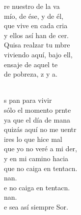 \begin{cancion}%
	re nuestro de la va\\
	mío, de ése, y de él,\\
	que vive en cada cria\\
	y ellos así han de cer.\\
	Quisa realzar tu mbre\\
	viviendo aquí, bajo ell,\\
	ensaje de aquel te\\
	de pobreza, z y a.\\\jump\\
	\begin{chorus}%
	s pan para vivir\\
	sólo el momento prnte\\
	ya que el día de mana \\
	quizás aquí no me uentr\\
	ires lo que hice mal\\
	que yo no veré a mi der,\\
	y en mi camino hacia \\
	que no caiga en tentacn.\\
	nan.\\
	e no caiga en tentacn.\\
	nan.\\
	e sea así siempre Sor.\\
	\end{chorus}%
	\jump\\
\end{cancion}%
